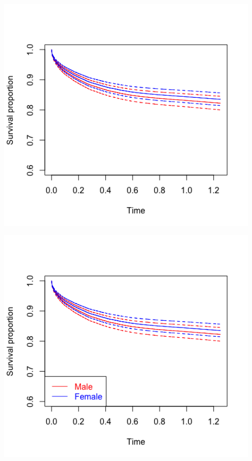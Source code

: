 \documentclass[12pt,letterpaper]{article}
\begin{document}

\includegraphics[width=0.99\textwidth]{Survival proportion_PS04.png}

\includegraphics[width=0.99\textwidth]{Survival proportion(with bottomleft)_PS04.png}
\end{document}
